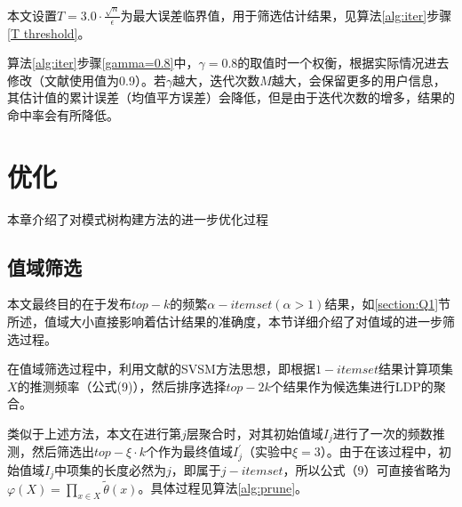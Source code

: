 \documentclass[UTF8,a4paper]{ctexart}
\begin{document}
  本文设置$T=3.0 \cdot \frac{\sqrt{n}}{\epsilon}$为最大误差临界值，用于筛选估计结果，见算法\ref{alg:iter}步骤\ref{T threshold}。

  算法\ref{alg:iter}步骤\ref{gamma=0.8}中，$\gamma=0.8$的取值时一个权衡，根据实际情况进去修改（文献\cite{wang2018locally}使用值为0.9）。若$\gamma$越大，迭代次数$M$越大，会保留更多的用户信息，其估计值的累计误差（均值平方误差）会降低，但是由于迭代次数的增多，结果的命中率会有所降低。



\section{优化}
本章介绍了对模式树构建方法的进一步优化过程

\subsection{值域筛选}
\label{section:prune candidate}
  本文最终目的在于发布$top-k$的频繁$\alpha -itemset(\alpha > 1)$结果，如\ref{section:Q1}节所述，值域大小直接影响着估计结果的准确度，本节详细介绍了对值域的进一步筛选过程。
  
  在值域筛选过程中，利用文献\cite{wang2018locally}的SVSM方法思想，即根据$1-itemset$结果计算项集$X$的推测频率（公式(9)），然后排序选择$top-2k$个结果作为候选集进行LDP的聚合。

  类似于上述方法，本文在进行第$j$层聚合时，对其初始值域$I_{j}$进行了一次的频数推测，然后筛选出$top- \xi \cdot k$个作为最终值域$I^{\prime}_{j}$（实验中$\xi = 3$）。由于在该过程中，初始值域$I_{j}$中项集的长度必然为$j$，即属于$j-itemset$，所以公式（9）可直接省略为 $\varphi(X)=\prod_{x \in X} \tilde{\theta}(x)$。具体过程见算法\ref{alg:prune}。
  
\end{document}
